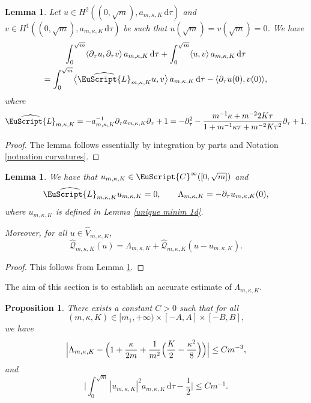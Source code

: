 \documentclass[10pt]{amsart}
\let\mathcal \EuScript
\newcommand{\scrQ}{\mathscr{Q}}
\newcommand{\cC}{\mathcal{C}}
\newcommand{\cL}{\mathcal{L}}
\theoremstyle{plain}
\newtheorem{lemma}[theorem]{Lemma}
\newtheorem{proposition}[theorem]{Proposition}
\theoremstyle{definition}
\newcommand{\dx}{\mathrm{\,d}}
\let\pa\partial
\begin{document}
\begin{lemma}\label{lem.ipp1D}
Let $u\in H^2((0,\sqrt{m}), a_{m,\kappa,K}\dx\tau)$ and $v\in H^1((0,\sqrt{m}), a_{m,\kappa,K}\dx\tau)$ {} be such that $u(\sqrt{m}) = v(\sqrt{m})= 0$. We have
\begin{multline}\label{eq:IPPno}
\int_0^{\sqrt{m}}\langle
\pa_\tau u,\pa_\tau v
\rangle\, a_{m,\kappa,K}\dx\tau
+
\int_0^{\sqrt{m}}\langle
u,v
\rangle\, a_{m,\kappa,K}\dx\tau
\\
=
\int_0^{\sqrt{m}}\bigl\langle
\widehat{\cL}_{m,\kappa,K} u,v
\bigr\rangle\, a_{m,\kappa,K}\dx\tau
-\langle\pa_\tau u(0),v(0)\rangle,
\end{multline}
where
\[
\widehat{\cL}_{m,\kappa,K} =- a^{-1}_{m,\kappa,K}\partial_\tau a_{m,\kappa,K}\partial_\tau
+1= -\pa^2_\tau - \frac{m^{-1}\kappa + m^{-2}2K\tau}{1 + m^{-1}\kappa\tau + m^{-2}K\tau^{2}}\pa_\tau + 1.
\]
\end{lemma}
\begin{proof}
The lemma follows essentially by integration by parts and Notation \ref{notnation curvatures}.
\end{proof}
\begin{lemma}\label{lem.EL1D}
We have that $u_{m,\kappa,K}\in \cC^\infty([0,\sqrt{m}])$ and
\[\widehat{\cL}_{m,\kappa,K} u_{m,\kappa,K} = 0,\qquad \Lambda_{m,\kappa,K}=-\pa_\tau u_{m,\kappa,K} (0),\]
where $u_{m,\kappa,K}$ is defined in Lemma \ref{unique minim 1d}.

Moreover, for all $u\in \widehat{V}_{m,\kappa,K}$,
\[\widehat{\scrQ}_{m,\kappa,K}(u) = \Lambda_{m,\kappa,K}+\widehat{\scrQ}_{m,\kappa,K}(u-u_{m,\kappa,K}).\]
\end{lemma}

\begin{proof}
This follows from Lemma \ref{lem.ipp1D}.
\end{proof}

The aim of this section is to establish an accurate estimate of $\Lambda_{m,\kappa,K}$.
\begin{proposition}\label{lem:ext}
There exists a constant $C>0$ such that for all
\[
(m,\kappa,K)\in[m_1,+\infty)\times[-A,A]\times [-B,B],
\]
we have
\[\Bigl|\Lambda_{m,\kappa,K} - \Bigl(1 + \frac{\kappa}{2m} + \frac{1}{m^2}\Bigl(\frac{K}{2}-\frac{\kappa^2}{8}\Bigr)\Bigr)\Bigr|\leq Cm^{-3},\]
and
\[\biggl|\int_0^{\sqrt{m}}|u_{m,\kappa,K}|^2a_{m,\kappa,K}\dx \tau - \frac{1}{2}\biggr| \leq Cm^{-1}.\]
\end{proposition}
\end{document}
